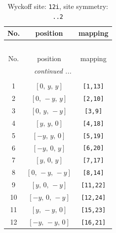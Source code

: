 \documentclass[fleqn,8pt]{jsarticle}
\begin{document}
\begin{longtable}{ccc}
\caption{Wyckoff site: {\tt 12i}, site symmetry: {\tt ..2}}
 \\
 \hline \hline
No. & position & mapping \\ \hline \endfirsthead

\multicolumn{2}{l}{\tablename\ \thetable{}} \\
 \hline \hline
No. & position & mapping \\ \hline \endhead

 \hline \hline
\multicolumn{2}{r}{\footnotesize\it continued ...} \\ \endfoot

 \hline \hline
\multicolumn{2}{r}{} \\ \endlastfoot

1 & $\left[ 0,\, y,\, y \right]$ & {\tt [1,13]} \\ \hline
2 & $\left[ 0,\, - y,\, y \right]$ & {\tt [2,10]} \\ \hline
3 & $\left[ 0,\, y,\, - y \right]$ & {\tt [3,9]} \\ \hline
4 & $\left[ y,\, y,\, 0 \right]$ & {\tt [4,18]} \\ \hline
5 & $\left[ - y,\, y,\, 0 \right]$ & {\tt [5,19]} \\ \hline
6 & $\left[ - y,\, 0,\, y \right]$ & {\tt [6,20]} \\ \hline
7 & $\left[ y,\, 0,\, y \right]$ & {\tt [7,17]} \\ \hline
8 & $\left[ 0,\, - y,\, - y \right]$ & {\tt [8,14]} \\ \hline
9 & $\left[ y,\, 0,\, - y \right]$ & {\tt [11,22]} \\ \hline
10 & $\left[ - y,\, 0,\, - y \right]$ & {\tt [12,24]} \\ \hline
11 & $\left[ y,\, - y,\, 0 \right]$ & {\tt [15,23]} \\ \hline
12 & $\left[ - y,\, - y,\, 0 \right]$ & {\tt [16,21]} \\
\end{longtable}
\renewcommand{\arraystretch}{1.2}
\end{document}
